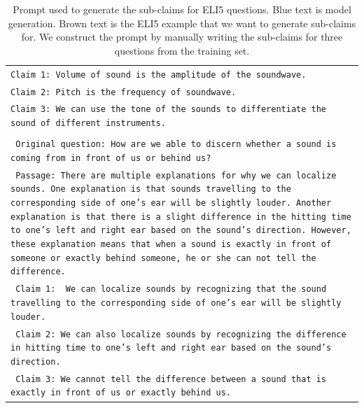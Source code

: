 \begin{table}[ht]
\begin{tabular}{>{\raggedright\arraybackslash\tt}p{}<{}}
            Claim 1: Volume of sound is the amplitude of the soundwave.\\
            Claim 2: Pitch is the frequency of soundwave.\\
            Claim 3: We can use the tone of the sounds to differentiate the sound of different instruments. \\\\
            \vspace{-0.7em}
            {\color{brown}Original question: How are we able to discern whether a sound is coming from in front of us or behind us?} \\
            \vspace{-0.7em}
            {\color{brown}Passage: There are multiple explanations for why we can localize sounds. One explanation is that sounds travelling to the corresponding side of one's ear will be slightly louder. Another explanation is that there is a slight difference in the hitting time to one's left and right ear based on the sound's direction. However, these explanation means that when a sound is exactly in front of someone or exactly behind someone, he or she can not tell the difference.} \\
            \vspace{-0.7em}
            {\color{brown}Claim 1:} {\color{blue} We can localize sounds by recognizing that the sound travelling to the corresponding side of one's ear will be slightly louder.} \\
            \vspace{-0.7em}
            {\color{blue}Claim 2: We can also localize sounds by recognizing the difference in hitting time to one's left and right ear based on the sound's direction.}\\
            \vspace{-0.7em}
            {\color{blue}Claim 3: We cannot tell the difference between a sound that is exactly in front of us or exactly behind us.} \\
        \bottomrule
    \end{tabular}
    \caption{
        Prompt used to generate the sub-claims for ELI5 questions.
        {\color{blue} Blue text is model generation.}
        {\color{brown} Brown text is the ELI5 example that we want to generate sub-claims for.}
        We construct the prompt by manually writing the sub-claims for three questions from the training set. 
    }
    \label{tab:eli5-claims-prompt}
\end{table}
